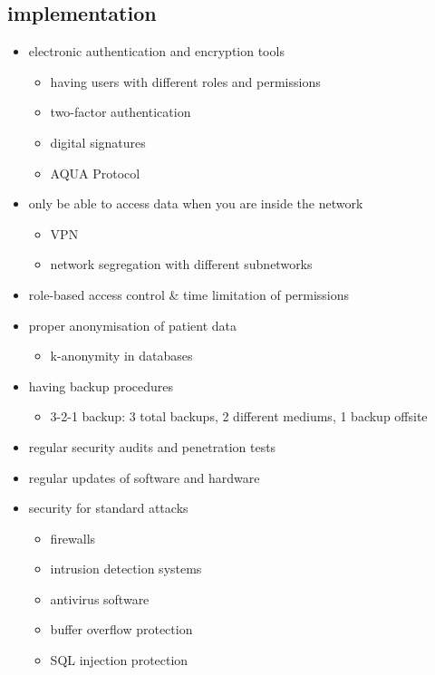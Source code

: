 \documentclass[12pt]{article}
\begin{document}
\subsection{implementation}
\begin{itemize}
    \item electronic authentication and encryption tools
    \begin{itemize}
        \item having users with different roles and permissions
        \item two-factor authentication
        \item digital signatures
        \item AQUA Protocol
    \end{itemize}
    \item only be able to access data when you are inside the network
    \begin{itemize}
        \item VPN
        \item network segregation with different subnetworks
    \end{itemize}
    \item role-based access control \&
            time limitation of permissions
    \item proper anonymisation of patient data
    \begin{itemize}
        \item k-anonymity in databases
    \end{itemize}
    \item having backup procedures
    \begin{itemize}
        \item 3-2-1 backup: 3 total backups, 2 different mediums, 1 backup offsite
    \end{itemize}
    \item regular security audits and penetration tests
    \item regular updates of software and hardware
    \item security for standard attacks
    \begin{itemize}
        \item firewalls
        \item intrusion detection systems
        \item antivirus software
        \item buffer overflow protection
        \item SQL injection protection
    \end{itemize}
\end{itemize}
\end{document}
